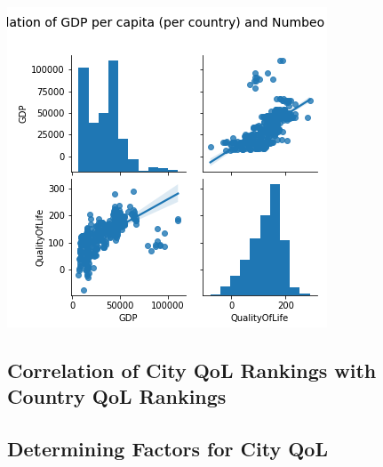 \documentclass[
  twocolumn]{article}
\begin{document}
\includegraphics[width=1\linewidth]{visuals/CorrelationGDP_QoL}

\hypertarget{correlation-of-city-qol-rankings-with-country-qol-rankings}{%
\subsection{Correlation of City QoL Rankings with Country QoL
Rankings}\label{correlation-of-city-qol-rankings-with-country-qol-rankings}}

\hypertarget{determining-factors-for-city-qol}{%
\subsection{Determining Factors for City
QoL}\label{determining-factors-for-city-qol}}
\end{document}
